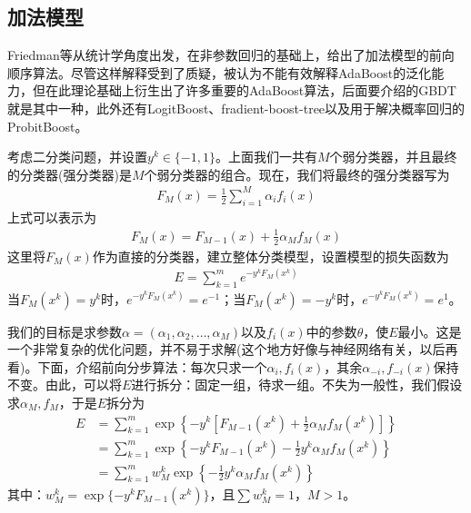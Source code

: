       \subsection{加法模型}
          \par
          Friedman\cite{2000.Friedman}等从统计学角度出发，在非参数回归的基础上，给出了加法模型的前向顺序算法。尽管这样解释受到了质疑，被认为不能有效解释AdaBoost的泛化能力，但在此理论基础上衍生出了许多重要的AdaBoost算法，后面要介绍的GBDT就是其中一种，此外还有LogitBoost、fradient-boost-tree以及用于解决概率回归的ProbitBoost。
          \par
          考虑二分类问题，并设置$y^k\in \{-1,1\}$。上面我们一共有$M$个弱分类器，并且最终的分类器(强分类器)是$M$个弱分类器的组合。现在，我们将最终的强分类器写为\cite{2009.Rojas}
          \begin{align*}
          F_M(x) = \frac{1}{2}\sum_{i=1}^M\alpha_i f_i(x)
          \end{align*}
          上式可以表示为
          \begin{align*}
          F_M(x) = F_{M-1}(x)+\frac{1}{2}\alpha_Mf_M(x)
          \end{align*}
          这里将$F_M(x)$作为直接的分类器，建立整体分类模型，设置模型的损失函数为
          \begin{align*}
          E = \sum_{k=1}^me^{-y^kF_M(x^k)}
          \end{align*}
          当$F_M(x^k) = y^k$时，$e^{-y^kF_M(x^k)} = e^{-1}$；当$F_M(x^k) =- y^k$时，$e^{-y^kF_M(x^k)} = e^{1}$。
          \par
          我们的目标是求参数$\alpha = (\alpha_1,\alpha_2,\dots,\alpha_M)$以及$f_i(x)$中的参数$\theta$，使$E$最小。这是一个非常复杂的优化问题，并不易于求解(这个地方好像与神经网络有关，以后再看)。下面，介绍前向分步算法：每次只求一个$\alpha_i,f_i(x)$，其余$\alpha_{-i},f_{-i}(x)$保持不变。由此，可以将$E$进行拆分：固定一组，待求一组。不失为一般性，我们假设求$\alpha_M,f_M$，于是$E$拆分为
          \begin{align*}
          E & = \sum_{k=1}^m\exp\left\{-y^k\left[F_{M-1}(x^k)+ \frac{1}{2}\alpha_M f_M(x^k)\right]\right\}\\
          & = \sum_{k=1}^m \exp\left\{-y^kF_{M-1}(x^k)-\frac{1}{2}y^k\alpha_M f_M(x^k)   \right\}\\
          &= \sum_{k=1}^m w_M^k \exp\left\{ -\frac{1}{2}y^k\alpha_Mf_M(x^k) \right\}
          \end{align*}
          其中：$w_M^k = \exp \{-y^k F_{M-1}(x^k)\}$，且$\sum w_M^k=1$，$M>1$。
          \par
